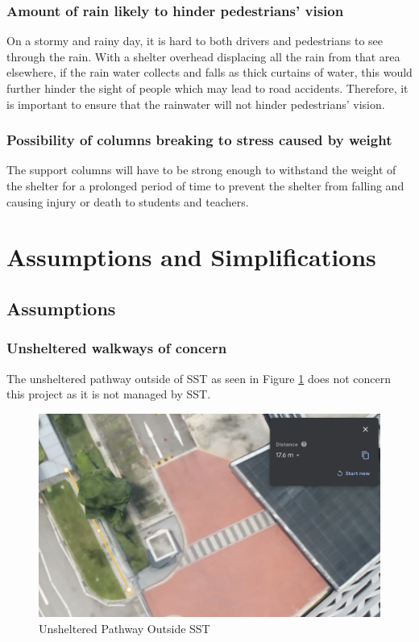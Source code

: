 \documentclass[a4paper,titlepage]{article}
\begin{document}
\pagebreak
\subsubsection{Amount of rain likely to hinder pedestrians' vision}

On a stormy and rainy day, it is hard to both drivers and pedestrians to see through the rain. With a shelter overhead displacing all the rain from that area elsewhere, if the rain water collects and falls as thick curtains of water, this would further hinder the sight of people which may lead to road accidents. Therefore, it is important to ensure that the rainwater will not hinder pedestrians' vision.

\subsubsection{Possibility of columns breaking to stress caused by weight}
The support columns will have to be strong enough to withstand the weight of the shelter for a prolonged period of time to prevent the shelter from falling and causing injury or death to students and teachers.

\section{Assumptions and Simplifications}\label{sec:Assumptions and Simplifications}

\subsection{Assumptions}\label{sec:Assumptions and Simplifications:Assumptions}

\subsubsection{Unsheltered walkways of concern}
The unsheltered pathway outside of SST as seen in Figure \ref{fig:unshelteredAreaOutsideSst} does not concern this project as it is not managed by SST.

\begin{figure}[htbp]
    \centering
    \includegraphics[width=\textwidth]{unshelteredAreaOutsideSst.png}
    \caption{Unsheltered Pathway Outside SST}
    \label{fig:unshelteredAreaOutsideSst}
\end{figure}
\end{document}
